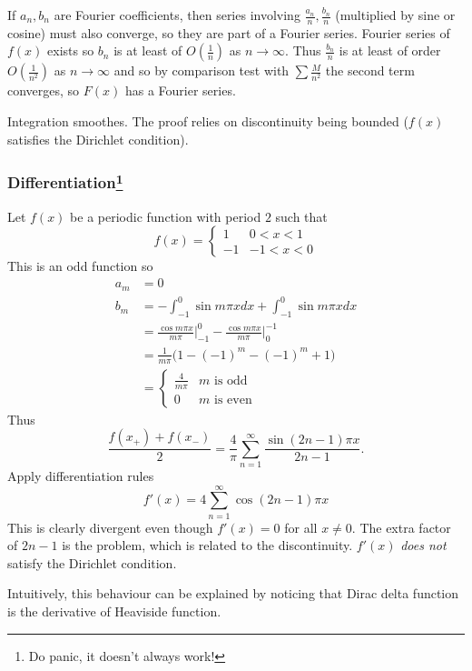 \documentclass[a4paper]{article}
\begin{document}
If $a_n, b_n$ are Fourier coefficients, then series involving $\frac{a_n}{n}, \frac{b_n}{n}$ (multiplied by sine or cosine) must also converge, so they are part of a Fourier series. Fourier series of $f(x)$ exists so $b_n$ is at least of $O(\frac{1}{n})$ as $n\to\infty$. Thus $\frac{b_n}{n}$ is at least of order $O(\frac{1}{n^2})$ as $n\to \infty$ and so by comparison test with $\sum \frac{M}{n^2}$ the second term converges, so $F(x)$ has a Fourier series.

\begin{note}
  Integration smoothes.
  The proof relies on discontinuity being bounded ($f(x)$ satisfies the Dirichlet condition).
\end{note}

\subsubsection{Differentiation\protect\footnote{Do panic, it doesn't always work!}}

Let $f(x)$ be a periodic function with period $2$ such that
\[
  f(x) =
  \begin{cases}
    1 & 0 < x < 1\\
    -1 & -1 < x < 0 
  \end{cases}
\]
This is an odd function so
\begin{align*}
  a_m &= 0 \\
  b_m &= -\int_{-1}^0 \sin m\pi x dx + \int_{-1}^0 \sin m\pi x dx \\
  &= \frac{\cos m\pi x}{m\pi} \Big|_{-1}^0 - \frac{\cos m\pi x}{m\pi} \Big|_0^{-1} \\
  &= \frac{1}{m\pi} \big(1- (-1)^m - (-1)^m + 1 \big) \\
  & =
  \begin{cases}
    \frac{4}{m\pi} & m \text{ is odd} \\
    0 & m \text{ is even}
  \end{cases}
\end{align*}
Thus
\[
  \frac{f(x_+)+f(x_-)}{2} = \frac{4}{\pi} \sum_{n=1}^\infty \frac{\sin(2n-1)\pi x}{2n-1}.
  \]
Apply differentiation rules
\[
  f'(x) = 4 \sum_{n=1}^\infty \cos(2n-1)\pi x
\]
This is clearly divergent even though $f'(x) = 0$ for all $x \neq 0$. The extra factor of $2n-1$ is the problem, which is related to the discontinuity. $f'(x)$ \emph{does not} satisfy the Dirichlet condition.

\begin{note}
  Intuitively, this behaviour can be explained by noticing that Dirac delta function is the derivative of Heaviside function.
\end{note}
\end{document}
